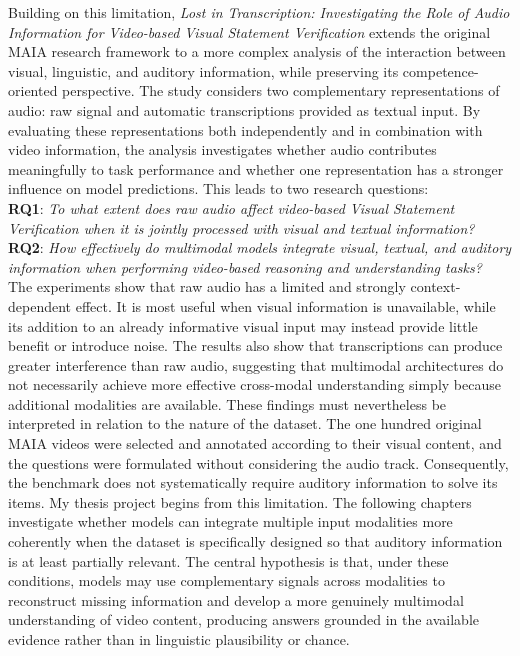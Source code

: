 Building on this limitation, \textit{Lost in Transcription: Investigating the Role of Audio Information for Video-based Visual Statement Verification} \cite{deodati2026lost} extends the original MAIA research framework to a more complex analysis of the interaction between visual, linguistic, and auditory information, while preserving its competence-oriented perspective.
The study considers two complementary representations of audio: raw signal and automatic transcriptions provided as textual input. By evaluating these representations both independently and in combination with video information, the analysis investigates whether audio contributes meaningfully to task performance and whether one representation has a stronger influence on model predictions. This leads to two research questions:
\\\textbf{RQ1}: \textit{To what extent does raw audio affect video-based Visual Statement Verification when it is jointly processed with visual and textual information?}
\\\textbf{RQ2}: \textit{How effectively do multimodal models integrate visual, textual, and auditory information when performing video-based reasoning and understanding tasks?}\\
The experiments show that raw audio has a limited and strongly context-dependent effect. It is most useful when visual information is unavailable, while its addition to an already informative visual input may instead provide little benefit or introduce noise. The results also show that transcriptions can produce greater interference than raw audio, suggesting that multimodal architectures do not necessarily achieve more effective cross-modal understanding simply because additional modalities are available.
These findings must nevertheless be interpreted in relation to the nature of the dataset. The one hundred original MAIA videos were selected and annotated according to their visual content, and the questions were formulated without considering the audio track. Consequently, the benchmark does not systematically require auditory information to solve its items.
My thesis project begins from this limitation. The following chapters investigate whether models can integrate multiple input modalities more coherently when the dataset is specifically designed so that auditory information is at least partially relevant. The central hypothesis is that, under these conditions, models may use complementary signals across modalities to reconstruct missing information and develop a more genuinely multimodal understanding of video content, producing answers grounded in the available evidence rather than in linguistic plausibility or chance.

